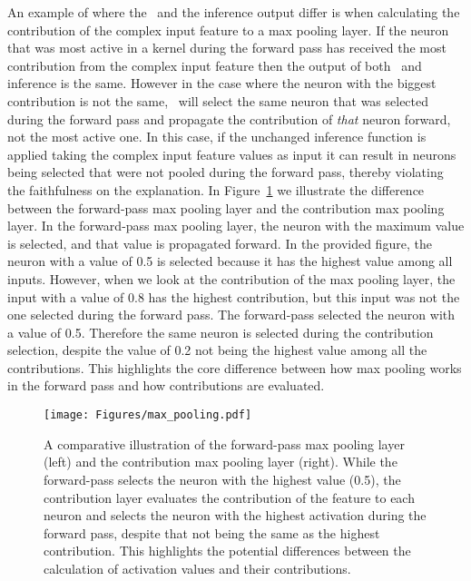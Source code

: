 An example of where the \CTC\ and the inference output differ is when calculating the contribution of the complex input feature to a max pooling layer. If the neuron that was most active in a kernel during the forward pass has received the most contribution from the complex input feature then the output of both \CTC\ and inference is the same. However in the case where the neuron with the biggest contribution is not the same, \CTC\ will select the same neuron that was selected during the forward pass and propagate the contribution of \textit{that} neuron forward, not the most active one. In this case, if the unchanged inference function is applied taking the complex input feature values as input it can result in neurons being selected that were not pooled during the forward pass, thereby violating the faithfulness on the explanation. In Figure~\ref{Fig:max_pooling} we illustrate the difference between the forward-pass max pooling layer and the contribution max pooling layer. In the forward-pass max pooling layer, the neuron with the maximum value is selected, and that value is propagated forward. In the provided figure, the neuron with a value of 0.5 is selected because it has the highest value among all inputs. However, when we look at the contribution of the max pooling layer, the input with a value of 0.8 has the highest contribution, but this input was not the one selected during the forward pass. The forward-pass selected the neuron with a value of 0.5. Therefore the same neuron is selected during the contribution selection, despite the value of 0.2 not being the highest value among all the contributions. This highlights the core difference between how max pooling works in the forward pass and how contributions are evaluated.


\begin{figure}[ht!]
	\begin{center}
		\texttt{[image: Figures/max\_pooling.pdf]}
	\end{center}
	\caption{A comparative illustration of the forward-pass max pooling layer (left) and the contribution max pooling layer (right). While the forward-pass selects the neuron with the highest value (0.5), the contribution layer evaluates the contribution of the feature to each neuron and selects the neuron with the highest activation during the forward pass, despite that not being the same as the highest contribution. This highlights the potential differences between the calculation of activation values and their contributions.}
	\label{Fig:max_pooling}
\end{figure} 

